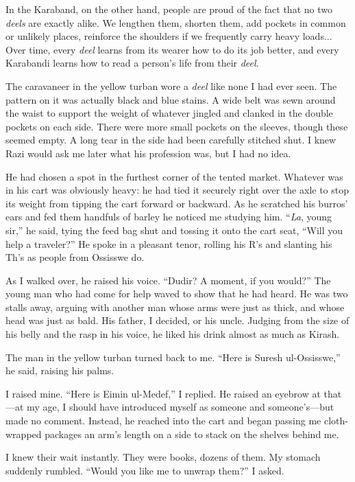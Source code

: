 In the Karaband, on the other hand, people are proud of the fact that
no two \emph{deels} are exactly alike.  We lengthen them, shorten them, add
pockets in common or unlikely places, reinforce the shoulders if we
frequently carry heavy loads... Over time, every \emph{deel} learns from
its wearer how to do its job better, and every Karabandi learns how to
read a person's life from their \emph{deel}.

The caravaneer in the yellow turban wore a \emph{deel} like none I had ever
seen.  The pattern on it was actually black and blue stains.  A wide
belt was sewn around the waist to support the weight of whatever
jingled and clanked in the double pockets on each side.  There were
more small pockets on the sleeves, though these seemed empty.  A long
tear in the side had been carefully stitched shut.  I knew Razi would
ask me later what his profession was, but I had no idea.

He had chosen a spot in the furthest corner of the tented market.
Whatever was in his cart was obviously heavy: he had tied it securely
right over the axle to stop its weight from tipping the cart forward
or backward.  As he scratched his burros' ears and fed them handfuls
of barley he noticed me studying him.  ``\emph{La}, young sir,'' he said,
tying the feed bag shut and tossing it onto the cart seat, ``Will you
help a traveler?''  He spoke in a pleasant tenor, rolling his R's and
slanting his Th's as people from Ossisswe do.

As I walked over, he raised his voice.  ``Dudir?  A moment, if you
would?''  The young man who had come for help waved to show that he had
heard.  He was two stalls away, arguing with another man whose arms
were just as thick, and whose head was just as bald.  His father, I
decided, or his uncle.  Judging from the size of his belly and the
rasp in his voice, he liked his drink almost as much as Kirash.

The man in the yellow turban turned back to me.  ``Here is Suresh
ul-Ossisswe,'' he said, raising his palms.

I raised mine.  ``Here is Eimin ul-Medef,'' I replied.  He raised an
eyebrow at that---at my age, I should have introduced myself as
someone and someone's---but made no comment.  Instead, he reached into
the cart and began passing me cloth-wrapped packages an arm's length
on a side to stack on the shelves behind me.

I knew their wait instantly.  They were books, dozens of them.  My
stomach suddenly rumbled.  ``Would you like me to unwrap them?'' I
asked.

